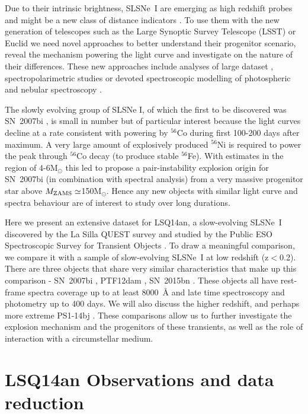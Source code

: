 \documentclass[useAMS,usenatbib]{mn2e}
\def\an{LSQ14an}
\begin{document}
Due to their intrinsic brightness, SLSNe~I are emerging as high redshift probes and might be a new class of distance indicators \citep{in14,pap15,sco16}. To use them with the new generation of telescopes such as the Large Synoptic Survey Telescope (LSST) or Euclid we need novel approaches  to better understand their progenitor scenario, reveal the mechanism powering the light curve and investigate on the nature of their differences. These new approaches include analyses of large dataset \citep[e.g.][]{ni15}, spectropolarimetric studies \citep{le15b,in16b,in16c} or devoted spectroscopic modelling of photospheric \citep{maz16} and nebular spectroscopy \citep{je16}.

The slowly evolving group of SLSNe I, of which the first to be discovered was SN~2007bi \citep{gy09,yo10}, is small 
in number but of particular interest because the light curves decline at a rate consistent with powering by 
$^{56}$Co during first 100-200 days after maximum. A  very large amount of explosively produced 
$^{56}$Ni is required to power the peak through $^{56}$Co decay (to produce stable $^{56}$Fe). With estimates 
in the region of 4-6M$_{\odot}$ this led  \citet{gy09} to propose a pair-instability explosion origin for SN~2007bi
(in combination with spectral analysis) from a very massive progenitor star above $M_{\rm ZAMS} \simeq$150M$_{\odot}$. 
Hence any new objects with similar light curve and spectra behaviour are of interest to study over long durations. 

Here we present an extensive dataset for  \an\/, a slow-evolving SLSNe~I discovered by the La Silla QUEST survey and 
studied by the Public ESO Spectroscopic Survey for Transient Objects \citep[PESSTO\footnote{www.pessto.org},][]{2015A&A...579A..40S}.   To draw a meaningful comparison, we  compare it with a sample of slow-evolving SLSNe~I
at low redshift (z$<$0.2).  There are three objects that share very similar characteristics that make up this comparison  -  SN~2007bi \citep{gy09,yo10}, PTF12dam \citep{ni13,ch15,vr16}, SN~2015bn \citep{ni16a,ni16b}. These objects all have 
 rest-frame spectra coverage up to at least 8000~\AA\/ and late time spectroscopy and photometry up to 400 days. 
We will also discuss the higher redshift, and perhaps more extreme PS1-14bj \citep{lu16}. These comparisons 
allow us to further investigate the explosion mechanism and  the progenitors  of these transients, as well as the role of  interaction with a circumstellar medium. 


\section{LSQ14an Observations and data reduction}\label{sec:data}
\end{document}
